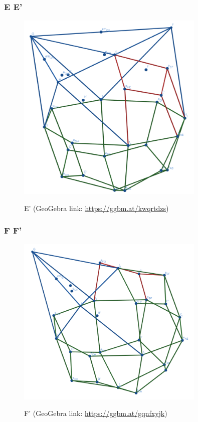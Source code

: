 \documentclass{article}
\begin{document}
\subsubsection{E \rightarrow E'}
\begin{figure}[H]
\caption{E' (GeoGebra link: \href{https://ggbm.at/kwqrtdzs}{https://ggbm.at/kwqrtdzs})}
\centering
\includegraphics[width=0.8\textwidth]{images/cl-07-5.png}
\label{fig:cube7-5}
\end{figure}
\subsubsection{F \rightarrow F'}
\begin{figure}[H]
\caption{F' (GeoGebra link: \href{https://ggbm.at/gqnfxyjk}{https://ggbm.at/gqnfxyjk})}
\centering
\includegraphics[width=0.8\textwidth]{images/cl-07-6.png}
\label{fig:cube7-6}
\end{figure}
\end{document}
